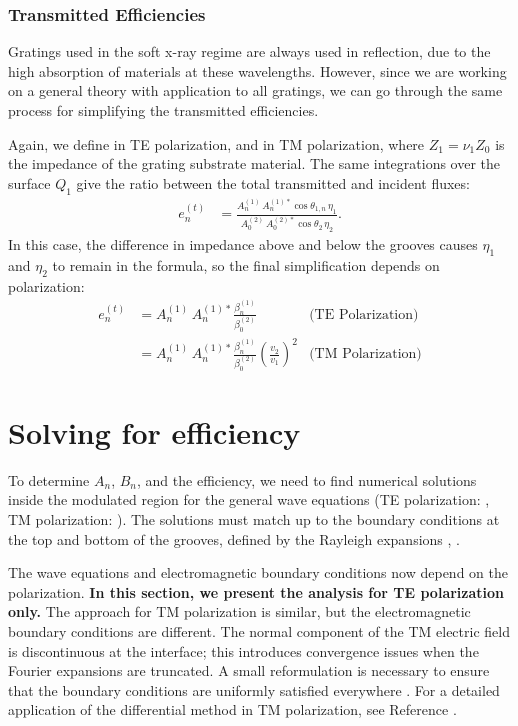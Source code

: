 \subsubsection{Transmitted Efficiencies}
Gratings used in the soft x-ray regime are always used in reflection, due to the high absorption of materials at these wavelengths.  However, since we are working on a general theory with application to all gratings, we can go through the same process for simplifying the transmitted efficiencies.  

Again, we define  in TE polarization, and  in TM polarization, where $Z_1 = \nu_1 Z_0$ is the impedance of the grating substrate material.  The same integrations over the surface $Q_1$ give the ratio between the total transmitted and incident fluxes:
\begin{align}
e_n^{(t)} &= \frac{    A_n^{(1)} \, A_n^{(1)\ast} \cos \theta_{1,n} \, \eta_1       }{    A_0^{(2)} \, A_0^{(2)\ast}  \cos \theta_{2} \,  \eta_2   }.
\end{align}
In this case, the difference in impedance above and below the grooves causes $\eta_1$ and $\eta_2$ to remain in the formula, so the final simplification depends on polarization:
\begin{align}
\label{eqnEffT}
e_n^{(t)} &= A_n^{(1)} \, A_n^{(1)\ast} \frac{  \beta_n^{(1)}   } {  \beta_0^{(2)} }  & \textrm{(TE Polarization)} \\
&= A_n^{(1)} \, A_n^{(1)\ast} \frac{  \beta_n^{(1)}   } {  \beta_0^{(2)} }  \left( \frac{v_2}{v_1} \right)^2 & \textrm{(TM Polarization)}
\end{align}

\section{Solving for efficiency}
To determine $A_n$, $B_n$, and the efficiency, we need to find numerical solutions inside the modulated region for the general wave equations (TE polarization: , TM polarization: ). The solutions must match up to the boundary conditions at the top and bottom of the grooves, defined by the Rayleigh expansions , .

The wave equations and electromagnetic boundary conditions now depend on the polarization.  \textbf{In this section, we present the analysis for TE polarization only.}  The approach for TM polarization is similar, but the electromagnetic boundary conditions are different.  The normal component of the TM electric field is discontinuous at the interface; this introduces convergence issues when the Fourier expansions are truncated. A small reformulation is necessary to ensure that the boundary conditions are uniformly satisfied everywhere \cite{Li96b}.  For a detailed application of the differential method in TM polarization, see Reference \cite[Chapter 4]{Nev02}.

